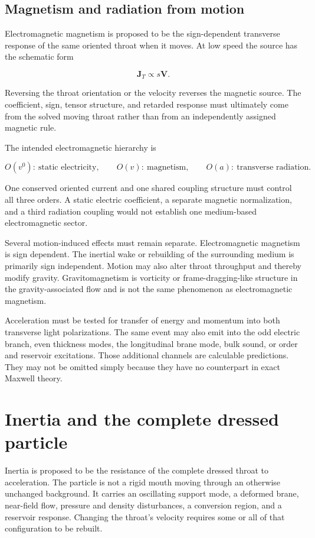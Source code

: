 \subsection{Magnetism and radiation from motion}

Electromagnetic magnetism is proposed to be the sign-dependent transverse
response of the same oriented throat when it moves. At low speed the source has
the schematic form

\[
\mathbf J_T\propto s\mathbf V.
\]

Reversing the throat orientation or the velocity reverses the magnetic source.
The coefficient, sign, tensor structure, and retarded response must ultimately
come from the solved moving throat rather than from an independently assigned
magnetic rule.

The intended electromagnetic hierarchy is

\[
O(v^0):\ \text{static electricity},
\qquad
O(v):\ \text{magnetism},
\qquad
O(a):\ \text{transverse radiation}.
\]

One conserved oriented current and one shared coupling structure must control
all three orders. A static electric coefficient, a separate magnetic
normalization, and a third radiation coupling would not establish one
medium-based electromagnetic sector.

Several motion-induced effects must remain separate. Electromagnetic magnetism
is sign dependent. The inertial wake or rebuilding of the surrounding medium is
primarily sign independent. Motion may also alter throat throughput and thereby
modify gravity. Gravitomagnetism is vorticity or frame-dragging-like structure
in the gravity-associated flow and is not the same phenomenon as electromagnetic
magnetism.

Acceleration must be tested for transfer of energy and momentum into both
transverse light polarizations. The same event may also emit into the odd
electric branch, even thickness modes, the longitudinal brane mode, bulk sound,
or order and reservoir excitations. Those additional channels are calculable
predictions. They may not be omitted simply because they have no counterpart in
exact Maxwell theory.

\section{Inertia and the complete dressed particle}

Inertia is proposed to be the resistance of the complete dressed throat to
acceleration. The particle is not a rigid mouth moving through an otherwise
unchanged background. It carries an oscillating support mode, a deformed brane,
near-field flow, pressure and density disturbances, a conversion region, and a
reservoir response. Changing the throat's velocity requires some or all of that
configuration to be rebuilt.


